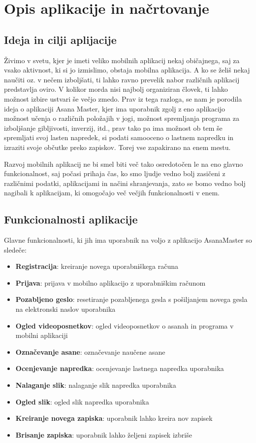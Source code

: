 \documentclass[a4paper, 12pt]{book}
\begin{document}
\chapter{Opis aplikacije in načrtovanje}
\label{ch1}

\section{Ideja in cilji aplijacije}
Živimo v svetu, kjer je imeti veliko mobilnih aplikacij nekaj običajnega, saj za vsako aktivnost, ki si jo izmislimo, obstaja mobilna aplikacija. A ko se želiš nekaj naučiti oz. v nečem izboljšati, ti lahko ravno prevelik nabor različnih aplikacij predstavlja oviro. V kolikor morda nisi najbolj organiziran človek, ti lahko možnost izbire ustvari še večjo zmedo. Prav iz tega razloga, se nam je porodila ideja o aplikaciji Asana Master, kjer ima uporabnik zgolj z eno aplikacijo možnost učenja o različnih položajih v jogi, možnost spremljanja programa za izboljšanje gibljivosti, inverzij, itd., prav tako pa ima možnost ob tem še spremljati svoj lasten napredek, si podati samooceno o lastnem napredku in izraziti svoje občutke preko zapiskov. Torej vse zapakirano na enem mestu.

Razvoj mobilnih aplikacij ne bi smel biti več tako osredotočen le na eno glavno funkcionalnost, saj počasi prihaja čas, ko smo ljudje vedno bolj zasičeni z različnimi podatki, aplikacijami in načini shranjevanja, zato se bomo vedno bolj nagibali k aplikacijam, ki omogočajo več večjih funkcionalnosti v enem.

\section{Funkcionalnosti aplikacije}
Glavne funkcionalnosti, ki jih ima uporabnik na voljo z aplikacijo AsanaMaster so sledeče:

 \begin{itemize}
  \item \textbf{Registracija}: kreiranje novega uporabniškega računa
  \item \textbf{Prijava}: prijava v mobilno aplikacijo z uporabniškim računom
  \item \textbf{Pozabljeno geslo}: resetiranje pozabljenega gesla s pošiljanjem novega gesla na elektronski naslov uporabnika
  \item \textbf{Ogled videoposnetkov}: ogled videoposnetkov o asanah in programa v mobilni aplikaciji
  \item \textbf{Označevanje asane}: označevanje naučene asane
  \item \textbf{Ocenjevanje napredka}: ocenjevanje lastnega napredka uporabnika
  \item \textbf{Nalaganje slik}: nalaganje slik napredka uporabnika
  \item \textbf{Ogled slik}: ogled slik napredka uporabnika
  \item \textbf{Kreiranje novega zapiska}: uporabnik lahko kreira nov zapisek
  \item \textbf{Brisanje zapiska}: uporabnik lahko željeni zapisek izbriše
\end{itemize}
\end{document}
